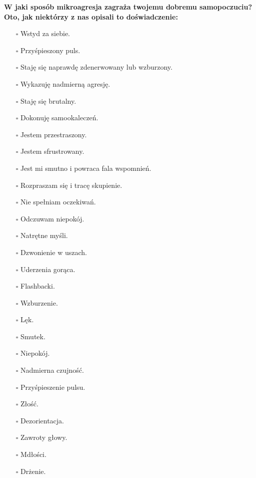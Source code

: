 \noindent\textcolor{ProcessBlue}{\textbf{\Large{W jaki sposób mikroagresja zagraża twojemu dobremu samopoczuciu?}}}\\
\textbf{\large{Oto, jak niektórzy z nas opisali to doświadczenie:}}
\begin{multicols}{2}
\begin{itemize}
\item[$\square$]{Wstyd za siebie.}
\item[$\square$]{Przyśpieszony puls.}
\item[$\square$]{Staję się naprawdę zdenerwowany lub wzburzony.}
\item[$\square$]{Wykazuję nadmierną agresję.}
\item[$\square$]{Staję się brutalny.}
\item[$\square$]{Dokonuję samookaleczeń.}
\item[$\square$]{Jestem przestraszony.}
\item[$\square$]{Jestem sfrustrowany.}
\item[$\square$]{Jest mi smutno i powraca fala wspomnień.}
\item[$\square$]{Rozpraszam się i tracę skupienie.}
\item[$\square$]{Nie spełniam oczekiwań.}
\item[$\square$]{Odczuwam niepokój.}
\item[$\square$]{Natrętne myśli.}
\item[$\square$]{Dzwonienie w uszach.}
\item[$\square$]{Uderzenia gorąca.}
\item[$\square$]{Flashbacki.}
\item[$\square$]{Wzburzenie.}
\item[$\square$]{Lęk.}
\item[$\square$]{Smutek.}
\item[$\square$]{Niepokój.}
\item[$\square$]{Nadmierna czujność.}
\item[$\square$]{Przyśpieszenie pulsu.}
\item[$\square$]{Złość.}
\item[$\square$]{Dezorientacja.}
\item[$\square$]{Zawroty głowy.}
\item[$\square$]{Mdłości.}
\item[$\square$]{Drżenie.}
\end{itemize}
\end{multicols}


